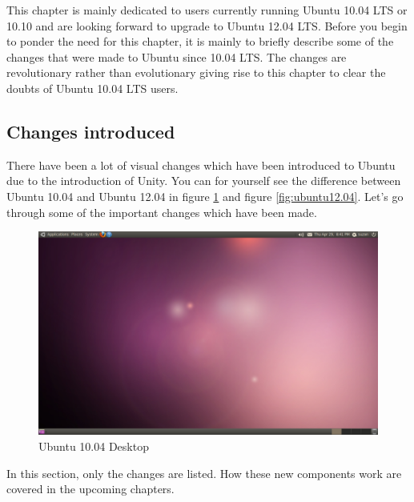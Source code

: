This chapter is mainly dedicated to users currently running Ubuntu 10.04 LTS or 10.10 and are looking forward to upgrade to Ubuntu 12.04 LTS. Before you begin to ponder the need for this chapter, it is mainly to briefly describe some of the changes that were made to Ubuntu since 10.04 LTS. The changes are revolutionary rather than evolutionary giving rise to this chapter to clear the doubts of Ubuntu 10.04 LTS users. 

\subsection*{Changes introduced}
There have been a lot of visual changes which have been introduced to Ubuntu due to the introduction of Unity. You can for yourself see the difference between Ubuntu 10.04 and Ubuntu 12.04 in figure \ref{fig:ubuntu10.04} and figure \ref{fig:ubuntu12.04}. Let's go through some of the important changes which have been made. \\

\begin{figure}[h!]	
	\centering
	\includegraphics[width=400pt]{./images/ubuntu10-04.png}
	\caption{Ubuntu 10.04 Desktop}	
	\label{fig:ubuntu10.04}		
\end{figure}

\par \noindent In this section, only the changes are listed. How these new components work are covered in the upcoming chapters. \\

